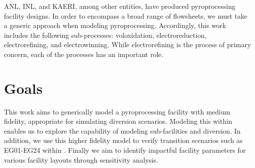 ANL, INL, and KAERI, among other entities, have produced pyroprocessing facility designs.
In order to encompass a broad range of flowsheets, we must take a generic approach when modeling pyroprocessing. Accordingly, this work includes the following sub-processes: voloxidation, electroreduction, electrorefining, and electrowinning. 
While electrorefining is the process of primary concern, each of the processes has an important role. 

\section{Goals}

This work aims to generically model a pyroprocessing facility with medium fidelity, appropriate for simulating diversion scenarios. Modeling
this within \Cyclus enables us to explore the capability of modeling sub-facilities and diversion. In addition, we use this higher fidelity model to verify transition
scenarios such as EG01-EG24 within \Cyclus \cite{wigeland_nuclear_2014}. Finally we aim to identify impactful facility parameters for
various facility layouts through sensitivity analysis. 